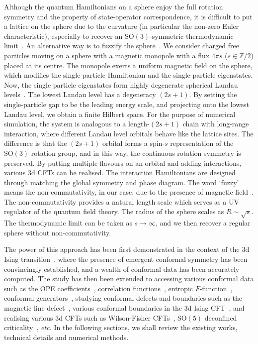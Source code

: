 \documentclass{timesjhep}
\begin{document}
Although the quantum Hamiltonians on a sphere enjoy the full rotation symmetry and the property of state-operator correspondence, it is difficult to put a lattice on the sphere due to the curvature (in particular the non-zero Euler characteristic), especially to recover an $\mathrm{SO}(3)$-symmetric thermodynamic limit~\cite{Brower2024Sphere}. An alternative way is to fuzzify the sphere~\cite{Madore1991Fuzzy}. We consider charged free particles moving on a sphere with a magnetic monopole with a flux $4\pi s$ ($s\in\mathbb{Z}/2$) placed at its centre. The monopole exerts a uniform magnetic field on the sphere, which modifies the single-particle Hamiltonian and the single-particle eigenstates. Now, the single particle eigenstates form highly degenerate spherical Landau levels~\cite{Haldane1983LLL,Wu1976LLL,Greiter2011LLL,Hasebe2010LLL}. The lowest Landau level has a degeneracy $(2s+1)$. By setting the single-particle gap to be the leading energy scale, and projecting onto the lowest Landau level, we obtain a finite Hilbert space. For the purpose of numerical simulation, the system is analogous to a length-$(2s+1)$ chain with long-range interaction, where different Landau level orbitals behave like the lattice sites. The difference is that the $(2s+1)$ orbital forms a spin-$s$ representation of the $\mathrm{SO}(3)$ rotation group, and in this way, the continuous rotation symmetry is preserved. By putting multiple flavours on an orbital and adding interactions, various 3d CFTs can be realised. The interaction Hamiltonians are designed through matching the global symmetry and phase diagram. The word `fuzzy' means the non-commutativity, in our case, due to the presence of magnetic field~\cite{Madore1991Fuzzy,Hasebe2010LLL}. The non-commutativity provides a natural length scale which serves as a UV regulator of the quantum field theory. The radius of the sphere scales as $R\sim\sqrt s$. The thermodynamic limit can be taken as $s\to\infty$, and we then recover a regular sphere without non-commutativity.

The power of this approach has been first demonstrated in the context of the 3d Ising transition~\cite{Zhu2022}, where the presence of emergent conformal symmetry has been convincingly established, and a wealth of conformal data has been accurately computed. The study has then been extended to accessing various conformal data such as the OPE coefficients~\cite{Hu2023Mar}, correlation functions~\cite{Han2023Jun}, entropic $F$-function~\cite{Hu2024}, conformal generators~\cite{Fardelli2024,Fan2024}, studying conformal defects and boundaries such as the magnetic line defect~\cite{Hu2023Aug,Zhou2024Jan}, various conformal boundaries in the 3d Ising CFT~\cite{Zhou2024Jul,Dedushenko2024}, and realising various 3d CFTs such as Wilson-Fisher CFTs~\cite{Han2023Dec}, $\mathrm{SO}(5)$ deconfined criticality~\cite{Zhou2023}, \textit{etc.} In the following sections, we shall review the existing works, technical details and numerical methods.
\end{document}
